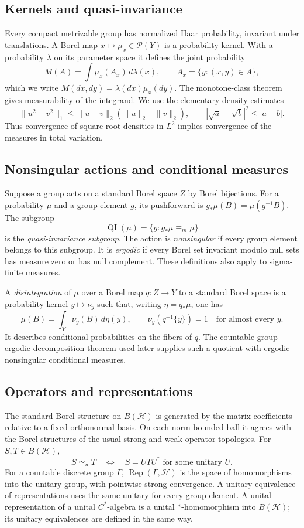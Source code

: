 \documentclass[11pt]{article}
\numberwithin{equation}{section}
\theoremstyle{definition}
\newcommand{\Prob}{\mathcal P}
\newcommand{\ME}{\mathrel{\equiv_m}}
\newcommand{\QI}{\operatorname{QI}}
\newcommand{\UE}{\mathrel{\simeq_u}}
\newcommand{\Rep}{\operatorname{Rep}}
\begin{document}
\subsection{Kernels and quasi-invariance}
Every compact metrizable group has normalized Haar probability,
invariant under translations. A Borel map $x\mapsto\mu_x\in\Prob(Y)$
is a probability kernel. With a probability $\lambda$ on its parameter
space it defines the joint probability
\[
 M(A)=\int\mu_x(A_x)\,d\lambda(x),\qquad
 A_x=\{y:(x,y)\in A\},
\]
which we write $M(dx,dy)=\lambda(dx)\mu_x(dy)$.
The monotone-class theorem gives measurability of the integrand.
We use the elementary density estimates
\[
 \|u^2-v^2\|_1\leq\|u-v\|_2(\|u\|_2+\|v\|_2),
 \qquad |\sqrt a-\sqrt b|^2\leq|a-b|.
\]
Thus convergence of square-root densities in $L^2$ implies
convergence of the measures in total variation.
\subsection{Nonsingular actions and conditional measures}
Suppose a group acts on a standard Borel space $Z$ by Borel bijections.
For a probability $\mu$ and a group element $g$, its pushforward is
$g_*\mu(B)=\mu(g^{-1}B)$. The subgroup
\[
 \QI(\mu)=\{g:g_*\mu\ME\mu\}
\]
is the \emph{quasi-invariance subgroup}. The action is \emph{nonsingular}
if every group element belongs to this subgroup. It is \emph{ergodic}
if every Borel set invariant modulo null sets has measure zero or has
null complement. These definitions also apply to sigma-finite measures.

A \emph{disintegration} of $\mu$ over a Borel map $q:Z\to Y$ to a
standard Borel space is a probability kernel $y\mapsto\nu_y$ such that,
writing $\eta=q_*\mu$, one has
\[
 \mu(B)=\int_Y\nu_y(B)\,d\eta(y),\qquad
 \nu_y(q^{-1}\{y\})=1\quad\text{for almost every }y.
\]
It describes conditional probabilities on the fibers of $q$. The
countable-group ergodic-decomposition theorem used later supplies such
a quotient with ergodic nonsingular conditional measures.

\subsection{Operators and representations}
The standard Borel structure on $B(\mathcal H)$ is generated by the
matrix coefficients relative to a fixed orthonormal basis. On each
norm-bounded ball it agrees with the Borel structures of the usual
strong and weak operator topologies. For $S,T\in B(\mathcal H)$,
\[
 S\UE T\quad\Longleftrightarrow\quad
 S=UTU^*\text{ for some unitary }U.
\]
For a countable discrete group $\Gamma$, $\Rep(\Gamma,\mathcal H)$
is the space of homomorphisms into the unitary group, with pointwise
strong convergence. A unitary equivalence of representations uses the
same unitary for every group element. A unital representation of a
unital $C^*$-algebra is a unital $*$-homomorphism into $B(\mathcal H)$;
its unitary equivalences are defined in the same way.
\end{document}
